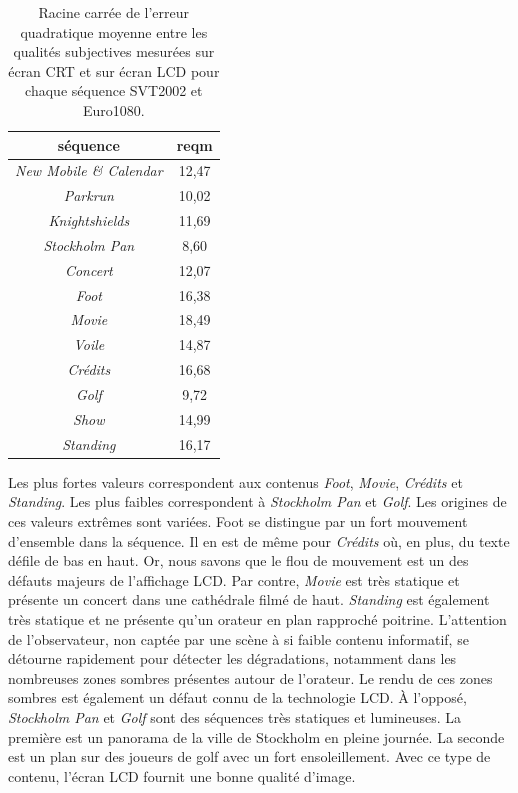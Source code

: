 \begin{table}[htbp]
\centering
\begin{tabular}{cc}\toprule
\textbf{séquence}						& \textbf{reqm}	\\ \toprule
\emph{New Mobile \& Calendar}	& 12,47	\\\midrule
\emph{Parkrun}							& 10,02	\\\midrule
\emph{Knightshields}					& 11,69	\\\midrule
\emph{Stockholm Pan}				& 8,60		\\\midrule
\emph{Concert}							& 12,07	\\\midrule
\emph{Foot}								& 16,38	\\\midrule
\emph{Movie}								& 18,49	\\\midrule
\emph{Voile}								& 14,87	\\\midrule
\emph{Crédits}							& 16,68	\\\midrule
\emph{Golf}									&  9,72		\\\midrule
\emph{Show}								& 14,99	\\\midrule
\emph{Standing}							& 16,17	\\\bottomrule
\end{tabular}
\caption{Racine carrée de l'erreur quadratique moyenne entre les qualités subjectives mesurées sur écran CRT et sur écran LCD pour chaque séquence SVT2002 et Euro1080.}
\label{tab:diffMOS}
\end{table}

Les plus fortes valeurs correspondent aux contenus \emph{Foot}, \emph{Movie}, \emph{Crédits} et \emph{Standing}. Les plus faibles correspondent à \emph{Stockholm Pan} et \emph{Golf}. Les origines de ces valeurs extrêmes sont variées. Foot se distingue par un fort mouvement d'ensemble dans la séquence. Il en est de même pour \emph{Crédits} où, en plus, du texte défile de bas en haut. Or, nous savons que le flou de mouvement est un des défauts majeurs de l'affichage LCD. Par contre, \emph{Movie} est très statique et présente un concert dans une cathédrale filmé de haut. \emph{Standing} est également très statique et ne présente qu'un orateur en plan rapproché poitrine. L'attention de l'observateur, non captée par une scène à si faible contenu informatif, se détourne rapidement pour détecter les dégradations, notamment dans les nombreuses zones sombres présentes autour de l'orateur. Le rendu de ces zones sombres est également un défaut connu de la technologie LCD. À l'opposé, \emph{Stockholm Pan} et \emph{Golf} sont des séquences très statiques et lumineuses. La première est un panorama de la ville de Stockholm en pleine journée. La seconde est un plan sur des joueurs de golf avec un fort ensoleillement. Avec ce type de contenu, l'écran LCD fournit une bonne qualité d'image.

